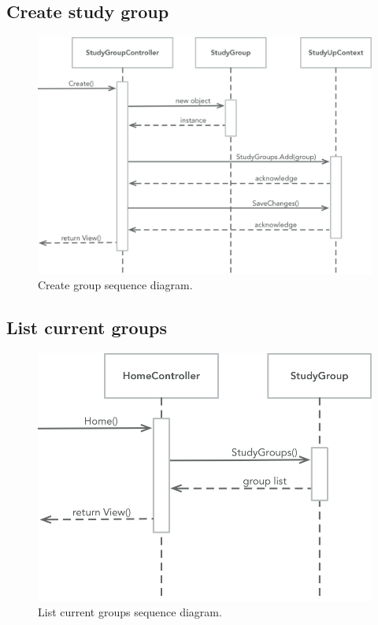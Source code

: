 \documentclass[12pt,letterpaper]{article}
\begin{document}
\subsection{Create study group}
\begin{figure}[!htb]
  \includegraphics[width=\linewidth]{CreateGroupUML.png}
  \caption{Create group sequence diagram.}
  \label{create_group}
\end{figure}
\clearpage

\subsection{List current groups}
\begin{figure}[!htb]
  \includegraphics[width=\linewidth]{CurrentGroupsUML.png}
  \caption{List current groups sequence diagram.}
  \label{current_groups}
\end{figure}
\clearpage
\end{document}
